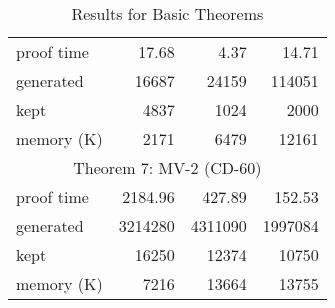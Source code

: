 \begin{table}[htbp]
\begin{tabular}{lrrr}
proof time  & 17.68    & 4.37    & 14.71     \\
generated   & 16687    & 24159   & 114051    \\
kept        & 4837     & 1024    & 2000      \\
memory (K)  & 2171     & 6479    & 12161     \\
\hline
          \multicolumn{4}{c}{Theorem 7: MV-2 (CD-60)} \\
proof time  & 2184.96  & 427.89  & 152.53    \\
generated   & 3214280  & 4311090 & 1997084   \\
kept        & 16250    & 12374   & 10750     \\
memory (K)  & 7216     & 13664   & 13755     \\
\end{tabular}
\caption{Results for Basic Theorems}
\end{table}

